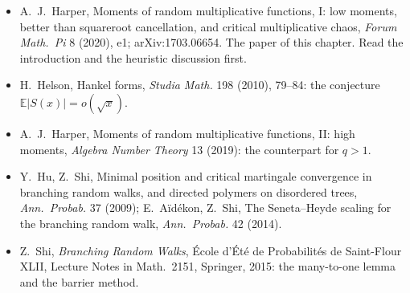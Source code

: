 \begin{itemize}
\item A.~J.~Harper, Moments of random multiplicative functions, I: low moments, better than squareroot cancellation, and critical multiplicative chaos, \emph{Forum Math.\ Pi} 8 (2020), e1; arXiv:1703.06654. The paper of this chapter. Read the introduction and the heuristic discussion first.
\item H.~Helson, Hankel forms, \emph{Studia Math.} 198 (2010), 79--84: the conjecture $\mathbb E|S(x)|=o(\sqrt x)$.
\item A.~J.~Harper, Moments of random multiplicative functions, II: high moments, \emph{Algebra Number Theory} 13 (2019): the counterpart for $q>1$.
\item Y.~Hu, Z.~Shi, Minimal position and critical martingale convergence in branching random walks, and directed polymers on disordered trees, \emph{Ann.\ Probab.} 37 (2009); E.~Aïdékon, Z.~Shi, The Seneta--Heyde scaling for the branching random walk, \emph{Ann.\ Probab.} 42 (2014).
\item Z.~Shi, \emph{Branching Random Walks}, \'Ecole d'\'Et\'e de Probabilit\'es de Saint-Flour XLII, Lecture Notes in Math.\ 2151, Springer, 2015: the many-to-one lemma and the barrier method.
\end{itemize}
